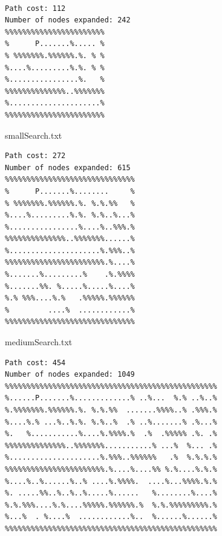 \begin{multicols*}{2}
\begin{Verbatim}[samepage=true]

Path cost: 112
Number of nodes expanded: 242
%%%%%%%%%%%%%%%%%%%%%%%
%      P.......%..... %
% %%%%%%%.%%%%%%.%. % %
%....%.........%.%. % %
%................%.   %
%%%%%%%%%%%%%%..%%%%%%%
%.....................%
%%%%%%%%%%%%%%%%%%%%%%%
\end{Verbatim}
smallSearch.txt\\

\begin{Verbatim}[samepage=true]
Path cost: 272
Number of nodes expanded: 615
%%%%%%%%%%%%%%%%%%%%%%%%%%%%%%
%      P.......%........     %
% %%%%%%%.%%%%%%.%. %.%.%%   %
%....%.........%.%. %.%..%...%
%................%....%..%%%.%
%%%%%%%%%%%%%%..%%%%%%%......%
%.....................%.%%%..%
%%%%%%%%%%%%%%%%%%%%%%%.%....%
%.......%.........%    .%.%%%%
%.......%%. %.....%.....%....%
%.% %%%....%.%   .%%%%%.%%%%%%
%         ....%  ............%
%%%%%%%%%%%%%%%%%%%%%%%%%%%%%%
\end{Verbatim}
mediumSearch.txt \\

\begin{Verbatim}[samepage=true]
Path cost: 454
Number of nodes expanded: 1049
%%%%%%%%%%%%%%%%%%%%%%%%%%%%%%%%%%%%%%%%%%%%%%%%%
%......P.......%.............% ..%...  %.% ..%..%
%.%%%%%%%.%%%%%%.%. %.%.%%  .......%%%%..% .%%%.%
%....%.% ...%..%.%. %.%..%  .% ..%.......% .%...%
%.   %...........%....%.%%%%.%  .%  .%%%%% .%. .%
%%%%%%%%%%%%%%..%%%%%%%...........% ...%  %... .%
%.....................%.%%%..%%%%%%   .%  %.%.%.%
%%%%%%%%%%%%%%%%%%%%%%%.%....%....%% %.%....%.%.%
%....%..%......%..% ....%.%%%%.  ....%...%%%%.%.%
%. .....%%..%..%..%.....%......   %........%....%
%.%.%%%....%.%....%%%%%.%%%%%%.%  %.%.%%%%%%%%%.%
%...%  . %....%  ............%..  %......%......%
%%%%%%%%%%%%%%%%%%%%%%%%%%%%%%%%%%%%%%%%%%%%%%%%%


\end{Verbatim}
\end{multicols*}
